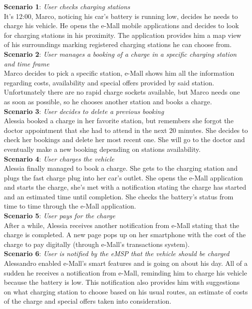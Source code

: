 \documentclass[12pt]{report}
\begin{document}
\bigskip

\textbf{Scenario 1}: \emph{User checks charging stations}\\
    It’s 12:00, Marco, noticing his car’s battery is running low, decides he needs to charge his vehicle. He opens the e-Mall mobile applications and decides  to look for charging stations in his proximity. The application provides him a map view of his surroundings marking registered charging stations he can choose from.\\
 

\textbf{Scenario 2}: \emph{User manages a booking of a charge in a specific charging station and time frame}\\
    Marco decides to pick a specific station, e-Mall shows him all the information regarding costs, availability and special offers provided by said station. Unfortunately there are no rapid charge sockets available, but Marco needs one as soon as possible, so he chooses another station and books a charge.\\
 

\textbf{Scenario 3}: \emph{User decides to delete a previous booking}\\
    Alessia booked a charge in her favorite station, but remembers she forgot the doctor appointment that she had to attend in the next 20 minutes. She decides to check her bookings and delete her most recent one. She will go to the doctor and eventually make a new booking depending on stations availability.\\
 

\textbf{Scenario 4}: \emph{User charges the vehicle}\\
    Alessia finally managed to book a charge. She gets to the charging station and plugs the fast charge plug into her car’s outlet. She opens the e-Mall application and starts the charge, she’s met with a notification stating the charge has started and an estimated time until completion. She checks the battery’s status from time to time through the e-Mall application.\\
 

\textbf{Scenario 5}: \emph{User pays for the charge}\\
    After a while, Alessia receives another notification from e-Mall stating that the charge is completed. A new page pops up on her smartphone with the cost of the charge to pay digitally (through e-Mall’s transactions system).\\
 

\textbf{Scenario 6}: \emph{User is notified by the eMSP that the vehicle should be charged}\\
    Alessandro enabled e-Mall’s smart features and is going on about his day. All of a sudden he receives a notification from e-Mall, reminding him to charge his vehicle because the battery is low. This notification also provides him with suggestions on what charging station to choose based on his usual routes, an estimate of costs of the charge and special offers taken into consideration.\\
 
\end{document}
